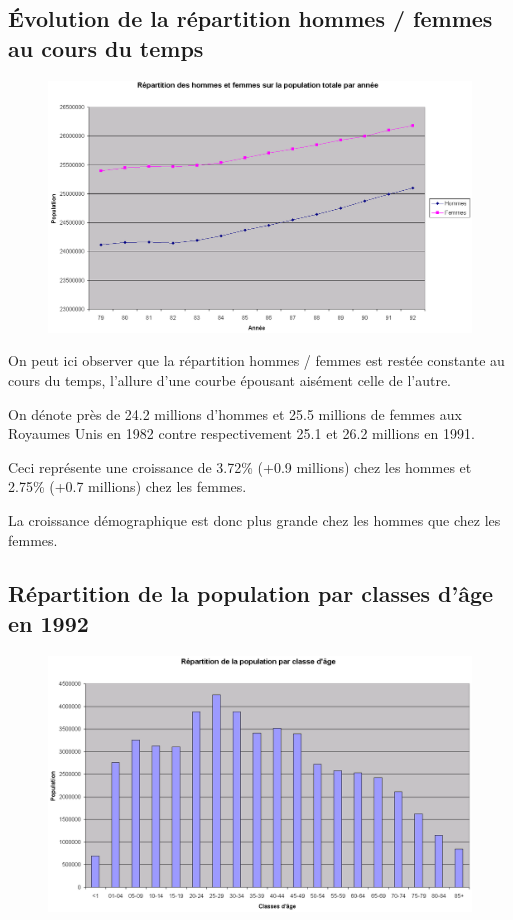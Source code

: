 \subsection{Évolution de la répartition hommes / femmes au cours du temps}
\begin{figure}[h!]
    \centering
    \includegraphics[width=\linewidth]{images/pop/repartitionHF.png}
\end{figure}

On peut ici observer que la répartition hommes / femmes est restée constante au cours du temps, l'allure d'une courbe épousant aisément celle de l'autre.

On dénote près de 24.2 millions d'hommes et 25.5 millions de femmes aux Royaumes Unis en 1982 contre respectivement 25.1 et 26.2 millions en 1991.

Ceci représente une croissance de 3.72\% (+0.9 millions) chez les hommes et 2.75\% (+0.7 millions) chez les femmes.

La croissance démographique est donc plus grande chez les hommes que chez les femmes.
\pagebreak


\subsection{Répartition de la population par classes d'âge en 1992}
\begin{figure}[h!]
    \centering
    \includegraphics[width=\linewidth]{images/pop/pyramideAges.png}
\end{figure}

